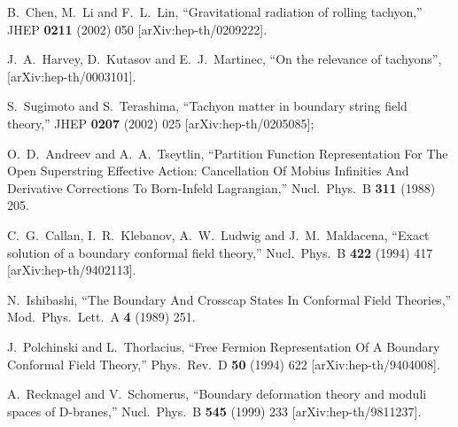 \documentclass[a4paper,12pt]{article}
\begin{document}
\begin{thebibliography}{99}
B.~Chen, M.~Li and F.~L.~Lin,
``Gravitational radiation of rolling tachyon,''
JHEP {\bf 0211} (2002) 050
[arXiv:hep-th/0209222].

J.~A.~Harvey, D.~Kutasov and E.~J.~Martinec,
``On the relevance of tachyons'',
[arXiv:hep-th/0003101].


S.~Sugimoto and S.~Terashima,
``Tachyon matter in boundary string field theory,''
JHEP {\bf 0207} (2002) 025
[arXiv:hep-th/0205085];

O.~D.~Andreev and A.~A.~Tseytlin,
``Partition Function Representation For The Open Superstring Effective Action: Cancellation Of Mobius Infinities And Derivative Corrections To
Born-Infeld Lagrangian,''
Nucl.\ Phys.\ B {\bf 311} (1988) 205.


C.~G.~Callan, I.~R.~Klebanov, A.~W.~Ludwig and J.~M.~Maldacena,
``Exact solution of a boundary conformal field theory,''
Nucl.\ Phys.\ B {\bf 422} (1994) 417
[arXiv:hep-th/9402113].

N.~Ishibashi,
``The Boundary And Crosscap States In Conformal Field Theories,''
Mod.\ Phys.\ Lett.\ A {\bf 4} (1989) 251.

J.~Polchinski and L.~Thorlacius,
``Free Fermion Representation Of A Boundary Conformal Field Theory,''
Phys.\ Rev.\ D {\bf 50} (1994) 622
[arXiv:hep-th/9404008].

A.~Recknagel and V.~Schomerus,
``Boundary deformation theory and moduli spaces of D-branes,''
Nucl.\ Phys.\ B {\bf 545} (1999) 233
[arXiv:hep-th/9811237].




\end{thebibliography}
 
\end{document}

